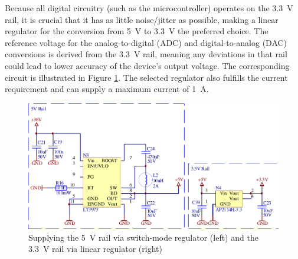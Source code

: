 Because all  digital circuitry (such  as the microcontroller) operates  on the
\SI{3.3}{\volt} rail,  it is  crucial that  it has  as little  noise/jitter as
possible,  making a  linear regulator  for the  conversion from  \SI{5}{\volt}
to  \SI{3.3}{\volt}  the  preferred  choice. The  reference  voltage  for  the
analog-to-digital  (ADC) and  digital-to-analog (DAC)  conversions is  derived
from the \SI{3.3}{\volt} rail, meaning any  deviations in that rail could lead
to lower accuracy of the device's output voltage. The corresponding circuit is
illustrated  in Figure  \ref{fig:circuit:rails}. The  selected regulator  also
fulfills  the  current  requirement  and  can  supply  a  maximum  current  of
\SI{1}{\ampere}.

\begin{figure}[th!]
    \center
    \includegraphics[width=.75\textwidth]{images/circuit/5v-3v-rails.pdf}
    \caption{Supplying the \SI{5}{\volt} rail via switch-mode regulator (left) and the \SI{3.3}{\volt} rail via linear regulator (right)}
    \label{fig:circuit:rails}
\end{figure}

